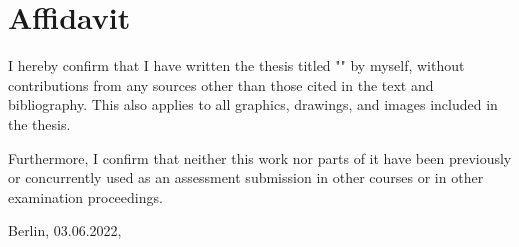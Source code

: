 \clearpage
{}
{}

\chapter*{Affidavit}
I hereby confirm that I have written the thesis titled "\thetitle" by myself, without contributions from any sources other than those cited in the text and bibliography. This also applies to all graphics, drawings, and images included in the thesis.

Furthermore, I confirm that neither this work nor parts of it have been previously or concurrently used as an assessment submission in other courses or in other examination proceedings.

Berlin, 03.06.2022,


